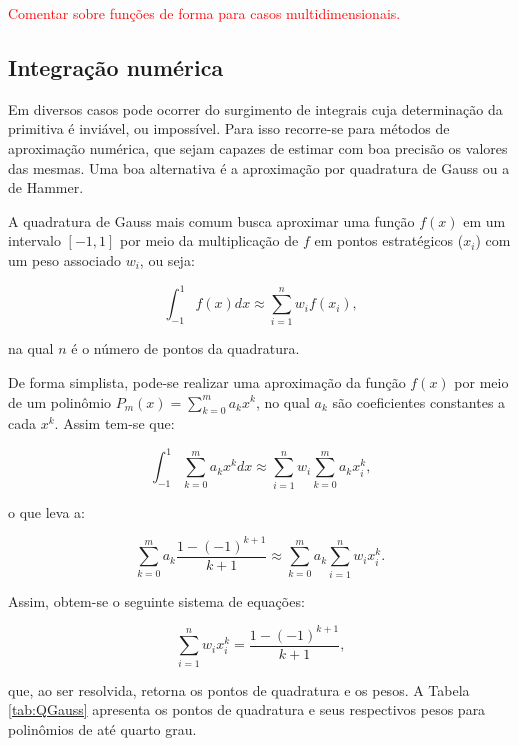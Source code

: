 \documentclass[_ArquivoPrincipal.tex]{subfiles}
\begin{document}
\textcolor{red}{Comentar sobre funções de forma para casos multidimensionais.}

\subsection{Integração numérica} \label{MEFP-IntNum}

Em diversos casos pode ocorrer do surgimento de integrais cuja determinação da primitiva é inviável, ou impossível. Para isso recorre-se para métodos de aproximação numérica, que sejam capazes de estimar com boa precisão os valores das mesmas. Uma boa alternativa é a aproximação por quadratura de Gauss ou a de Hammer.

A quadratura de Gauss mais comum busca aproximar uma função $f(x)$ em um intervalo $[-1,1]$ por meio da multiplicação de $f$ em pontos estratégicos ($x_i$) com um peso associado $w_i$, ou seja:

\begin{equation}
    \int_{-1}^1{f(x)dx}\approx\sum_{i=1}^n{w_if(x_i)}\text{,}
\end{equation}

\noindent na qual $n$ é o número de pontos da quadratura.

De forma simplista, pode-se realizar uma aproximação da função $f(x)$ por meio de um polinômio $P_m(x)=\sum_{k=0}^m{a_kx^k}$, no qual $a_k$ são coeficientes constantes a cada $x^k$. Assim tem-se que:

\begin{equation}
    \int_{-1}^1{\sum_{k=0}^m{a_kx^k}dx}\approx\sum_{i=1}^n{w_i\sum_{k=0}^m{a_kx_i^k}}\text{,}
\end{equation}

\noindent o que leva a:

\begin{equation}
    \sum_{k=0}^m{a_k\frac{1-(-1)^{k+1}}{k+1}}\approx\sum_{k=0}^m{a_k\sum_{i=1}^n{w_ix_i^k}}\text{.}
\end{equation}

Assim, obtem-se o seguinte sistema de equações:

\begin{equation}
    \sum_{i=1}^n{w_ix_i^k}=\frac{1-(-1)^{k+1}}{k+1}\text{,}
\end{equation}

\noindent que, ao ser resolvida, retorna os pontos de quadratura e os pesos. A Tabela \ref{tab:QGauss} apresenta os pontos de quadratura e seus respectivos pesos para polinômios de até quarto grau.
\end{document}
